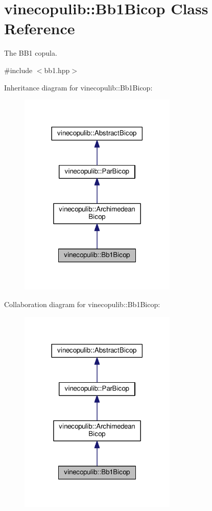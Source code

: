 \hypertarget{classvinecopulib_1_1_bb1_bicop}{}\section{vinecopulib\+:\+:Bb1\+Bicop Class Reference}
\label{classvinecopulib_1_1_bb1_bicop}


The B\+B1 copula.  




{\ttfamily \#include $<$bb1.\+hpp$>$}



Inheritance diagram for vinecopulib\+:\+:Bb1\+Bicop\+:
\nopagebreak
\begin{figure}[H]
\begin{center}
\leavevmode
\includegraphics[width=213pt]{classvinecopulib_1_1_bb1_bicop__inherit__graph}
\end{center}
\end{figure}


Collaboration diagram for vinecopulib\+:\+:Bb1\+Bicop\+:
\nopagebreak
\begin{figure}[H]
\begin{center}
\leavevmode
\includegraphics[width=213pt]{classvinecopulib_1_1_bb1_bicop__coll__graph}
\end{center}
\end{figure}
